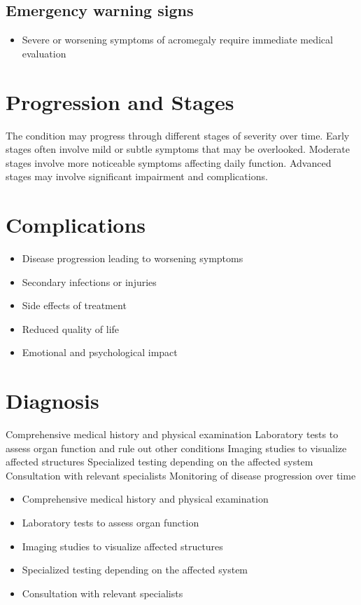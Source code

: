 \subsection{Emergency warning signs}
\begin{itemize}[noitemsep]
  \item Severe or worsening symptoms of acromegaly require immediate medical evaluation
\end{itemize}
\section{Progression and Stages}
The condition may progress through different stages of severity over time. Early stages often involve mild or subtle symptoms that may be overlooked. Moderate stages involve more noticeable symptoms affecting daily function. Advanced stages may involve significant impairment and complications.
\section{Complications}
\begin{itemize}[noitemsep]
  \item Disease progression leading to worsening symptoms
  \item Secondary infections or injuries
  \item Side effects of treatment
  \item Reduced quality of life
  \item Emotional and psychological impact
\end{itemize}
\section{Diagnosis}
Comprehensive medical history and physical examination Laboratory tests to assess organ function and rule out other conditions Imaging studies to visualize affected structures Specialized testing depending on the affected system Consultation with relevant specialists Monitoring of disease progression over time

\begin{itemize}[noitemsep]
  \item Comprehensive medical history and physical examination
  \item Laboratory tests to assess organ function
  \item Imaging studies to visualize affected structures
  \item Specialized testing depending on the affected system
  \item Consultation with relevant specialists
\end{itemize}

